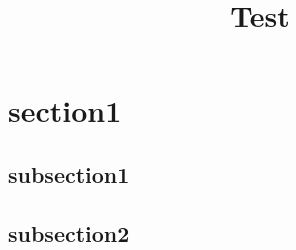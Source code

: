 \documentclass[slidestop,compress,11pt]{beamer}
\title[Test]{Test}
\begin{document}
\section{section1}
\subsection{subsection1}
\begin{frame}
\end{frame}
\subsection{subsection2}
\begin{frame}
\end{frame}
\end{document}
